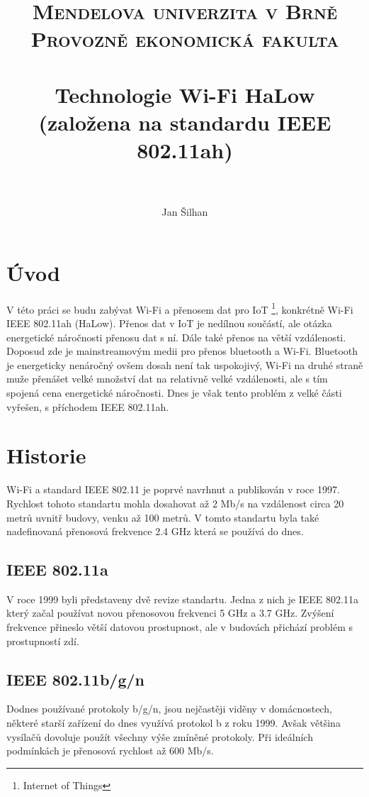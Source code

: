 \documentclass[paper=a4, fontsize=11pt]{scrartcl}
\date{\displaydate{date}}
\title{	
\normalfont \normalsize 
\textsc{Mendelova univerzita v Brně\\Provozně ekonomická fakulta} \\ [25pt] 
\horrule{0.5pt} \\[0.4cm] 
\huge Technologie Wi-Fi HaLow (založena na standardu IEEE 802.11ah) \\ %
\horrule{2pt} \\[0.5cm] 
}
\author{Jan Šilhan} %
\date{\displaydate{date}}
\numberwithin{equation}{section}
\numberwithin{figure}{section}
\numberwithin{table}{section}
\begin{document}
\maketitle 

\newpage

\tableofcontents

\newpage


\section{Úvod}

V této práci se budu zabývat Wi-Fi a přenosem dat pro IoT \footnote{Internet of Things}, 
konkrétně Wi-Fi IEEE 802.11ah (HaLow).
Přenos dat v IoT je nedílnou součástí, ale otázka energetické náročnosti přenosu dat s ní.
Dále také přenos na větší vzdálenosti. 
Doposud zde je mainstreamovým medii pro přenos bluetooth a Wi-Fi. 
Bluetooth je energeticky nenáročný ovšem dosah není tak uspokojivý, 
Wi-Fi na druhé straně muže přenášet velké množství dat na relativně velké vzdálenosti, 
ale s tím spojená cena energetické náročnosti. 
Dnes je však tento problém z velké části vyřešen, s příchodem IEEE 802.11ah. 

\section{Historie}
Wi-Fi a standard IEEE 802.11 je poprvé navrhnut a publikován v roce 1997. 
Rychlost tohoto standartu mohla dosahovat až 2 Mb/s na vzdálenost circa 20 metrů uvnitř budovy, 
venku až 100 metrů.
V tomto standartu byla také nadefinovaná přenosová frekvence 2.4 GHz která se používá do dnes.
	\subsection{IEEE 802.11a}
	V roce 1999 byli představeny dvě revize standartu. Jedna z nich je 
	IEEE 802.11a který začal používat novou přenosovou frekvenci 5 GHz a 3.7 GHz. 
	Zvýšení frekvence přineslo větší datovou prostupnost, 
	ale v budovách přichází problém s prostupností zdí. 

	\subsection{IEEE 802.11b/g/n}
	Dodnes používané protokoly b/g/n, 
	jsou nejčastěji viděny v domácnostech, 
	některé starší zařízení do dnes využívá protokol b z roku 1999. 
	Avšak většina vysílačů dovoluje použít všechny výše zmíněné protokoly. 
	Při ideálních podmínkách je přenosová rychlost až 600 Mb/s.
\end{document}
